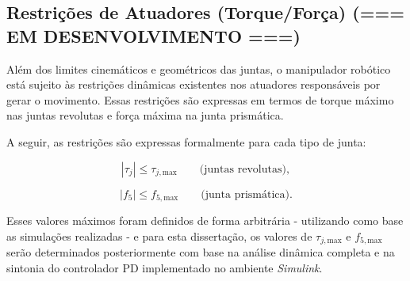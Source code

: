 \subsection{Restrições de Atuadores (Torque/Força) (=== EM DESENVOLVIMENTO ===)}

Além dos limites cinemáticos e geométricos das juntas, o manipulador robótico está sujeito às restrições dinâmicas existentes nos atuadores responsáveis por gerar o movimento.  
Essas restrições são expressas em termos de torque máximo nas juntas revolutas e força máxima na junta prismática.

A seguir, as restrições são expressas formalmente para cada tipo de junta:

\begin{equation}
\label{eq:limite_torque}
|\tau_j| \leq \tau_{j,\text{max}} \qquad \text{(juntas revolutas)},
\end{equation}

\begin{equation}
\label{eq:limite_forca}
|f_5| \leq f_{5,\text{max}} \qquad \text{(junta prismática)}.
\end{equation}

Esses valores máximos foram definidos de forma arbitrária - utilizando como base as simulações realizadas - e para esta dissertação, os valores de $\tau_{j,\text{max}}$ e $f_{5,\text{max}}$ serão determinados posteriormente com base na análise dinâmica completa e na sintonia do controlador PD implementado no ambiente \emph{Simulink}.  

